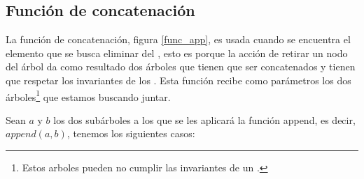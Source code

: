 \subsection{Funci\'on de concatenaci\'on}

La funci\'on de concatenación, figura \ref{func_app}, es usada cuando se encuentra el elemento que
se busca eliminar del {\arn}, esto es porque la acci\'on de retirar un nodo del \'arbol da como
resultado dos \'arboles que tienen que ser concatenados y tienen que respetar los invariantes de
los {\arns}. Esta funci\'on recibe como parámetros los dos \'arboles\footnote{Estos arboles pueden
no cumplir las invariantes de un {\arn}.} que estamos buscando juntar.

Sean $a$ y $b$ los dos subárboles a los que se les aplicar\'a la funci\'on append, es decir,
$append(a,b)$, tenemos los siguientes casos:

